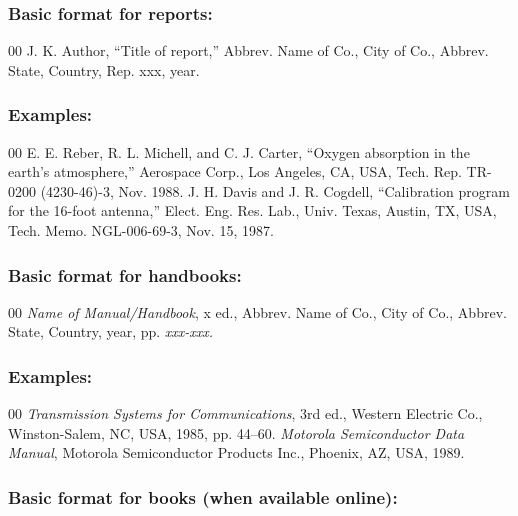 \subsubsection*{Basic format for reports:}

\begin{thebibliography}{00}
 J. K. Author, ``Title of report,'' Abbrev. Name of Co., City of Co., Abbrev.
State, Country, Rep. {xxx}, year.
\end{thebibliography}

\subsubsection*{Examples:}

\begin{thebibliography}{00}
 E. E. Reber, R. L. Michell, and C. J. Carter, ``Oxygen absorption in the earth's atmosphere,'' Aerospace Corp., Los Angeles, CA, USA, Tech. Rep. TR-0200 (4230-46)-3, Nov. 1988.
 J. H. Davis and J. R. Cogdell, ``Calibration program for the 16-foot antenna,'' Elect. Eng. Res. Lab., Univ. Texas, Austin, TX, USA, Tech. Memo. NGL-006-69-3, Nov. 15, 1987.
\end{thebibliography}

\subsubsection*{Basic format for handbooks:}

\begin{thebibliography}{00}
 \textit{Name of Manual/Handbook}, x ed., Abbrev. Name of Co., City of Co., Abbrev. State, Country, year, pp.
\textit{xxx-xxx.}
\end{thebibliography}

\subsubsection*{Examples:}

\begin{thebibliography}{00}
 \textit{Transmission Systems for Communications}, 3rd ed., Western Electric Co., Winston-Salem, NC, USA, 1985, pp. 44--60.
 \textit{Motorola Semiconductor Data Manual}, Motorola Semiconductor Products Inc., Phoenix, AZ, USA, 1989.
\end{thebibliography}

\subsubsection*{Basic format for books (when available online): }


